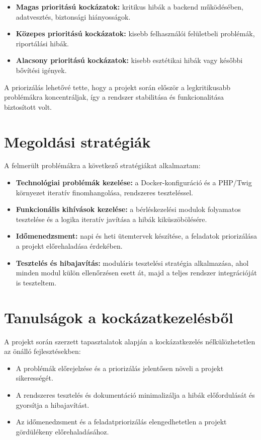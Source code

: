 \begin{itemize}
    \item \textbf{Magas prioritású kockázatok:} kritikus hibák a backend működésében, adatvesztés, biztonsági hiányosságok.
    \item \textbf{Közepes prioritású kockázatok:} kisebb felhasználói felületbeli problémák, riportálási hibák.
    \item \textbf{Alacsony prioritású kockázatok:} kisebb esztétikai hibák vagy későbbi bővítési igények.
\end{itemize}

A priorizálás lehetővé tette, hogy a projekt során először a legkritikusabb problémákra koncentráljak, 
így a rendszer stabilitása és funkcionalitása biztosított volt.

\section{Megoldási stratégiák}

A felmerült problémákra a következő stratégiákat alkalmaztam:
\begin{itemize}
    \item \textbf{Technológiai problémák kezelése:} a Docker-konfiguráció és a PHP/Twig környezet iteratív finomhangolása, rendszeres teszteléssel.
    \item \textbf{Funkcionális kihívások kezelése:} a bérléskezelési modulok folyamatos tesztelése és a logika iteratív javítása a hibák kiküszöbölésére.
    \item \textbf{Időmenedzsment:} napi és heti ütemtervek készítése, a feladatok priorizálása a projekt előrehaladása érdekében.
    \item \textbf{Tesztelés és hibajavítás:} moduláris tesztelési stratégia alkalmazása, ahol minden modul külön ellenőrzésen esett át, majd a teljes rendszer integrációját is teszteltem.
\end{itemize}

\section{Tanulságok a kockázatkezelésből}

A projekt során szerzett tapasztalatok alapján a kockázatkezelés nélkülözhetetlen az önálló fejlesztésekben:
\begin{itemize}
    \item A problémák előrejelzése és a priorizálás jelentősen növeli a projekt sikerességét.
    \item A rendszeres tesztelés és dokumentáció minimalizálja a hibák előfordulását és gyorsítja a hibajavítást.
    \item Az időmenedzsment és a feladatpriorizálás elengedhetetlen a projekt gördülékeny előrehaladásához.
\end{itemize}